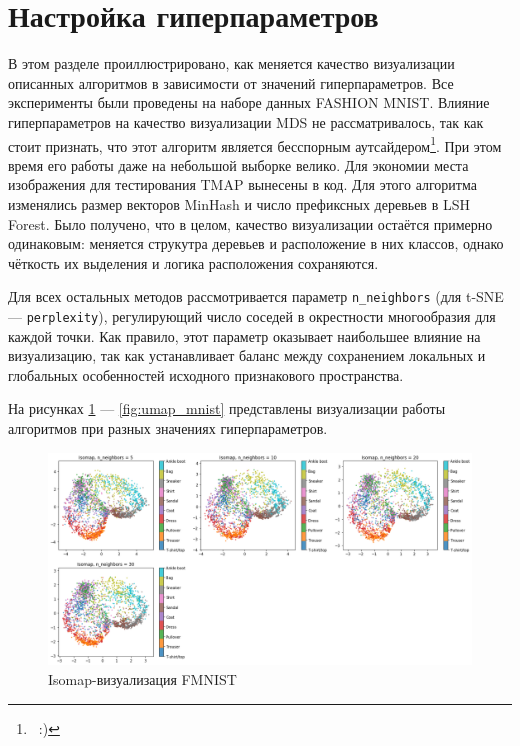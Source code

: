 \documentclass[10pt, a4paper]{extarticle}
\newcommand{\code}[1]{\texttt{#1}}
\begin{document}
\section{Настройка гиперпараметров}\label{hparam}

В этом разделе проиллюстрировано, как меняется качество визуализации описанных алгоритмов в зависимости от значений гиперпараметров. Все эксперименты были проведены на наборе данных FASHION MNIST. Влияние гиперпараметров на качество визуализации MDS не рассматривалось, так как стоит признать, что этот алгоритм является бесспорным аутсайдером\footnote{\, :)}. При этом время его работы даже на небольшой выборке велико. Для экономии места изображения для тестирования TMAP вынесены в код. Для этого алгоритма изменялись размер векторов MinHash и число префиксных деревьев в LSH Forest. Было получено, что в целом, качество визуализации остаётся примерно одинаковым: меняется струкутра деревьев и расположение в них классов, однако чёткость их выделения и логика расположения сохраняются.

Для всех остальных методов рассмотривается параметр \code{n\_neighbors} (для t-SNE — \code{perplexity}), регулирующий число соседей в окрестности многообразия для каждой точки.
Как правило, этот параметр оказывает наибольшее влияние на визуализацию, так как устанавливает баланс между сохранением локальных и глобальных особенностей исходного признакового пространства.

На рисунках \ref{fig:isomap_mnist} — \ref{fig:umap_mnist} представлены визуализации работы алгоритмов при разных значениях гиперпараметров.

\begin{figure}[htp!]
    \centering
    \includegraphics[width=\linewidth]{isomap_mnist.png}
    \caption{Isomap-визуализация FMNIST}
    \label{fig:isomap_mnist}
\end{figure}
\end{document}
